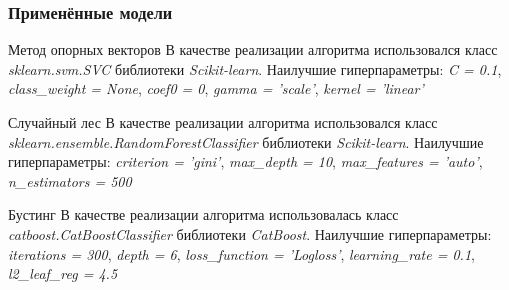 \documentclass[aspectratio=169,8pt]{beamer}
\begin{document}
\begin{frame}
\frametitle{Применённые модели}

\begin{block}{Метод опорных векторов}
В качестве реализации алгоритма использовался класс \emph {sklearn.svm.SVC} библиотеки \emph {Scikit-learn}. Наилучшие гиперпараметры\footnotemark:
\newline \emph {C = 0.1}, \emph {class\_weight = None}, \emph {coef0 = 0}, \emph {gamma = 'scale'}, \emph {kernel = 'linear'}
\end{block}

\begin{block}{Случайный лес}
В качестве реализации алгоритма использовался класс \emph {sklearn.ensemble.RandomForestClassifier} библиотеки \emph {Scikit-learn}. Наилучшие гиперпараметры\footnotemark[1]:
\newline \emph {criterion = 'gini'}, \emph {max\_depth = 10}, \emph {max\_features = 'auto'}, \emph {n\_estimators = 500}
\end{block}

\begin{block}{Бустинг}
В качестве реализации алгоритма использовалась класс \emph {catboost.CatBoostClassifier} библиотеки \emph {CatBoost}. Наилучшие гиперпараметры\footnotemark[1]:
\newline \emph {iterations = 300}, \emph {depth = 6}, \emph {loss\_function = 'Logloss'}, \emph {learning\_rate = 0.1}, \emph {l2\_leaf\_reg = 4.5}
\end{block}


\end{frame}
\end{document}
